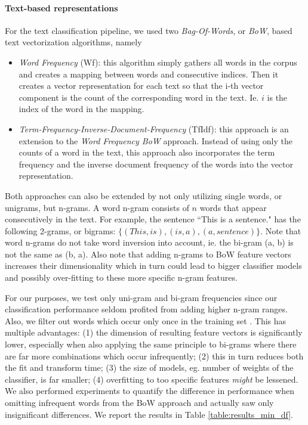 \paragraph{Text-based representations}
For the text classification pipeline, we used two \textit{Bag-Of-Words}, or \textit{BoW}, based text vectorization algorithms, namely
\begin{itemize}
\item{\textit{Word Frequency} (Wf): this algorithm simply gathers all words in the corpus and creates a mapping between words and consecutive indices. Then it creates a vector representation for each text so that the i-th vector component is the count of the corresponding word in the text. Ie. $i$ is the index of the word in the mapping.}
\item{\textit{Term-Frequency-Inverse-Document-Frequency} (TfIdf): this approach is an extension to the \textit{Word Frequency BoW} approach. Instead of using only the counts of a word in the text, this approach also incorporates the term frequency and the inverse document frequency of the words into the vector representation.}
\end{itemize}
Both approaches can also be extended by not only utilizing single words, or unigrams, but n-grams. A word n-gram consists of $n$ words that appear consecutively in the text.
For example, the sentence ``This is a sentence." has the following 2-grams, or bigrams: $\{ (This, is), (is, a), (a, sentence) \}$.
Note that word n-grams do not take word inversion into account, ie. the bi-gram (a, b) is not the same as (b, a).
Also note that adding n-grams to BoW feature vectors increases their dimensionality which in turn could lead to bigger classifier models and possibly over-fitting to these more specific n-gram features.

For our purposes, we test only uni-gram and bi-gram frequencies since our classification performance seldom profited from adding higher n-gram ranges.
Also, we filter out words which occur only once in the training set \cite{Heap2017}.
This has multiple advantages: (1) the dimension of resulting feature vectors is significantly lower, especially when also applying the same principle to bi-grams where there are far more combinations which occur infrequently; (2) this in turn reduces both the fit and transform time; (3) the size of models, eg. number of weights of the classifier, is far smaller; (4) overfitting to too specific features \textit{might} be lessened.
We also performed experiments to quantify the difference in performance when omitting infrequent words from the BoW approach and actually saw only insignificant differences.
We report the results in Table \ref{table:results_min_df}.

